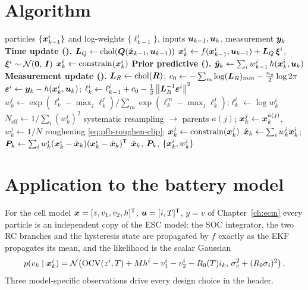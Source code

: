 \section{Algorithm}
\begin{algorithm}[H]
\caption{PF-Bootstrap --- one sampling period}
\begin{algorithmic}[1]
\Require particles $\{\bm{x}_{k-1}^i\}$ and log-weights $\{\ell_{k-1}^i\}$, inputs $\bm{u}_{k-1},\bm{u}_k$, measurement $\bm{y}_k$
\State \textbf{Time update ().}  $\bm{L}_Q \gets \operatorname{chol}(\bm{Q}(\hat{\bm{x}}_{k-1},\bm{u}_{k-1}))$
  \State $\bm{x}_k^i \gets f(\bm{x}_{k-1}^i, \bm{u}_{k-1}) + \bm{L}_Q \,\bm{\xi}^i$, \quad $\bm{\xi}^i \sim \mathcal{N}\!\left(\bm{0},\,\bm{I}\right)$
  \State $\bm{x}_k^i \gets \operatorname{constrain}(\bm{x}_k^i)$
\EndFor
\State \textbf{Prior predictive ().} $\hat{\bm{y}}_k \gets \sum_i w_{k-1}^i\, h(\bm{x}_k^i, \bm{u}_k)$
\State \textbf{Measurement update ().} $\bm{L}_R \gets \operatorname{chol}(\bm{R})$; \; $c_0 \gets -\sum_m \log (\bm{L}_R)_{mm} - \tfrac{n_y}{2}\log 2\pi$
  \State $\bm{\varepsilon}^i \gets \bm{y}_k - h(\bm{x}_k^i,\bm{u}_k)$; \quad
         $\ell_k^i \gets \ell_{k-1}^i + c_0 - \tfrac12 \left\lVert \bm{L}_R^{-1}\bm{\varepsilon}^i \right\rVert^2$
\EndFor
\State $w_k^i \gets \exp(\ell_k^i - \max_j \ell_k^j) \big/ \sum_m \exp(\ell_k^m - \max_j \ell_k^j)$;\quad $\ell_k^i \gets \log w_k^i$
\State $N_{\mathrm{eff}} \gets 1/\sum_i (w_k^i)^2$
  \State systematic resampling $\to$ parents $a(j)$; \; $\bm{x}_k^j \gets \bm{x}_k^{a(j)}$, \; $w_k^j \gets 1/N$
  \State roughening \eqref{eq:pfb-roughen-clip}; \; $\bm{x}_k^j \gets \operatorname{constrain}(\bm{x}_k^j)$
\EndIf
\State $\hat{\bm{x}}_k \gets \sum_i w_k^i \bm{x}_k^i$; \quad
       $\bm{P}_k \gets \sum_i w_k^i (\bm{x}_k^i-\hat{\bm{x}}_k)(\bm{x}_k^i-\hat{\bm{x}}_k)^{\mathsf{T}}$
\Ensure $\hat{\bm{x}}_k$, $\bm{P}_k$, $\{\bm{x}_k^i, w_k^i\}$
\end{algorithmic}
\end{algorithm}

\section{Application to the battery model}
\label{sec:pfb-battery}
For the cell model $\bm{x} = [z, v_1, v_2, h]^{\mathsf{T}}$, $\bm{u} = [i, T]^{\mathsf{T}}$, $y = v$ of
Chapter~\ref{ch:ecm} every particle is an independent copy of the ESC model: the SOC integrator,
the two RC branches and the hysteresis state are propagated by $f$ exactly as the EKF propagates
its mean, and the likelihood is the scalar Gaussian
\begin{equation}
  p(v_k \mid \bm{x}_k^i) = \mathcal{N}\!\left(\mathrm{OCV}(z^i,T) + M h^i - v_1^i - v_2^i - R_0(T) i_k,\,\sigma_v^2 + (R_0 \sigma_i)^2\right).
  \label{eq:pfb-celllik}
\end{equation}
Three model-specific observations drive every design choice in the header.

